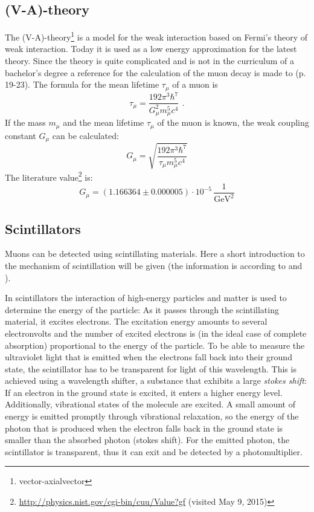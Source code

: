 \subsection{(V-A)-theory}
The (V-A)-theory\footnote{vector-axialvector} is a model for the weak interaction based on Fermi's theory of weak interaction. Today it is 
used as a low energy approximation for the latest theory. Since the theory is quite complicated and is not in the curriculum of a bachelor's 
degree a reference for the calculation of the muon decay is made to \cite{staatsex} (p. 19-23). The formula for the mean lifetime $\tau_\mu$ of a muon is
\begin{equation}
    \tau_\mu = \frac{192 \pi^3 \hbar^7}{G_\mu^2 m_\mu^5 c^4}\ \, .
\end{equation}
If the mass $m_\mu$ and the mean lifetime $\tau_\mu$ of the muon is known, the weak coupling constant $G_\mu$ can be calculated:
\begin{equation}
    \label{eq:weakcouplingconstant}
    G_\mu = \sqrt{\frac{192 \pi^3 \hbar^7}{\tau_\mu m_\mu^5 c^4}}
\end{equation}
The literature value\footnote{\url{http://physics.nist.gov/cgi-bin/cuu/Value?gf} (visited May 9, 2015)} is:
\begin{equation}
    \label{eq:litval:weakcouplingconstant}
    G_\mu = \left( 1.166364 \pm 0.000005 \right) \cdot 10^{-5}\,\frac{1}{\text{GeV}^2}
\end{equation}


\subsection{Scintillators}
Muons can be detected using scintillating materials.
Here a short introduction to the mechanism of scintillation will be given
(the information is according to \cite{dem4} and \cite{staatsex}).

In scintillators the interaction of high-energy particles and matter is used to determine
the energy of the particle:
As it passes through the scintillating material, it excites electrons.
The excitation energy amounts to several electronvolts and the number of excited electrons is (in the ideal case
of complete absorption) proportional to the energy of the particle.
To be able to measure the ultraviolet light that is emitted when the electrons fall back into their ground state,
the scintillator has to be transparent for light of this wavelength.
This is achieved using a wavelength shifter, a substance that exhibits a large \emph{stokes shift}:
If an electron in the ground state is excited, it enters a higher energy level.
Additionally, vibrational states of the molecule are excited.
A small amount of energy is emitted promptly through vibrational relaxation,
so the energy of the photon that is produced when the electron falls back in the ground state
is smaller than the absorbed photon (stokes shift).
For the emitted photon, the scintillator is transparent,
thus it can exit and be detected by a photomultiplier.






